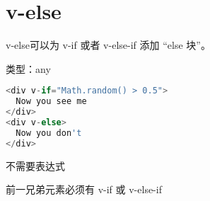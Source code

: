 \begin{lstlisting}[language=JavaScript]

\end{lstlisting}

\chapter{v-else}

v-else可以为 v-if 或者 v-else-if 添加 “else 块”。



\begin{compactitem}
\item 类型：any
\end{compactitem}


\begin{lstlisting}[language=JavaScript]
<div v-if="Math.random() > 0.5">
  Now you see me
</div>
<div v-else>
  Now you don't
</div>
\end{lstlisting}

\begin{compactitem}
\item 不需要表达式
\item 前一兄弟元素必须有 v-if 或 v-else-if
\end{compactitem}

\begin{lstlisting}[language=JavaScript]

\end{lstlisting}




\begin{lstlisting}[language=JavaScript]

\end{lstlisting}




\begin{lstlisting}[language=JavaScript]

\end{lstlisting}




\begin{lstlisting}[language=JavaScript]

\end{lstlisting}




\begin{lstlisting}[language=JavaScript]

\end{lstlisting}





